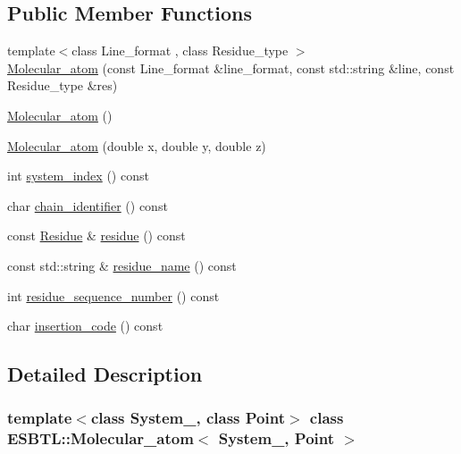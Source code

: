 \subsection*{Public Member Functions}
\begin{DoxyCompactItemize}
\item 
{\footnotesize template$<$class Line\+\_\+format , class Residue\+\_\+type $>$ }\\\hyperlink{classESBTL_1_1Molecular__atom_ac32221d9e98536591fae017386cd4d82}{Molecular\+\_\+atom} (const Line\+\_\+format \&line\+\_\+format, const std\+::string \&line, const Residue\+\_\+type \&res)
\item 
\hyperlink{classESBTL_1_1Molecular__atom_a628dcff0a6307d4e49bb8a295ad2bd9f}{Molecular\+\_\+atom} ()
\item 
\hyperlink{classESBTL_1_1Molecular__atom_a5ce88fe393e6b78ac28de314a458461b}{Molecular\+\_\+atom} (double x, double y, double z)
\item 
int \hyperlink{classESBTL_1_1Molecular__atom_aa82969b5f5bb9bd0f59f4ad6548ea756}{system\+\_\+index} () const
\item 
char \hyperlink{classESBTL_1_1Molecular__atom_a2a3e6ea3f4491a81b4b4f77ae28e8f09}{chain\+\_\+identifier} () const
\item 
const \hyperlink{classESBTL_1_1Molecular__atom_a24e68b497c2f43b77ca43be36af7bcd1}{Residue} \& \hyperlink{classESBTL_1_1Molecular__atom_a96a14b402625e528a38410c5b483b8ac}{residue} () const
\item 
const std\+::string \& \hyperlink{classESBTL_1_1Molecular__atom_a61d6ee7dda9e312112eb433cf96ffa2e}{residue\+\_\+name} () const
\item 
int \hyperlink{classESBTL_1_1Molecular__atom_a0ac28cedb09615d293a6b3ed026f52d7}{residue\+\_\+sequence\+\_\+number} () const
\item 
char \hyperlink{classESBTL_1_1Molecular__atom_ab3624555c42198359e9f0e8e5914ba3e}{insertion\+\_\+code} () const
\end{DoxyCompactItemize}


\subsection{Detailed Description}
\subsubsection*{template$<$class System\+\_\+, class Point$>$\newline
class E\+S\+B\+T\+L\+::\+Molecular\+\_\+atom$<$ System\+\_\+, Point $>$}

